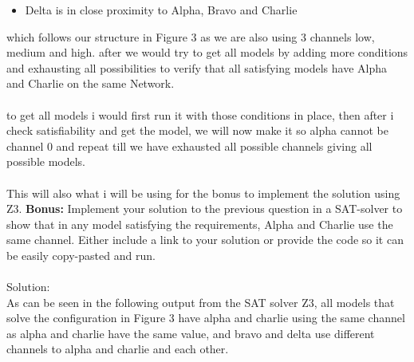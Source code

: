 \documentclass{article}
\newcommand*\moveToRight[1]{\hspace*{0em plus 1fill}\makebox{(#1)}}
\begin{document}
\begin{enumerate}[(a)]
\begin{itemize}
            \item Delta is in close proximity to Alpha, Bravo and Charlie
        \end{itemize}
        which follows our structure in Figure 3 as we are also using 3 channels low, medium and high. 
        after we would try to get all models by adding more conditions and exhausting all possibilities to verify that all satisfying models have Alpha and Charlie on the same Network.\\\\ to get all models i would first run it with those conditions in place, then after i check satisfiability and get the model, we will now make it so alpha cannot be channel 0 and repeat till we have exhausted all possible channels giving all possible models. \\\\ This will also what i will be using for the bonus to implement the solution using Z3.
        \newpage
        \textbf{Bonus:} Implement your solution to the previous question in a SAT-solver to show that in any model satisfying the requirements, Alpha and Charlie use the same channel. Either include a link to your solution or provide the code so it can be easily copy-pasted and run. \moveToRight{10* marks}\\\\
        Solution:\\
        
        As can be seen in the following output from the SAT solver Z3, all models that solve the configuration in Figure 3 have alpha and charlie using the same channel as alpha and charlie have the same value, and bravo and delta use different channels to alpha and charlie and each other.
\end{enumerate}

\newpage
\end{document}

